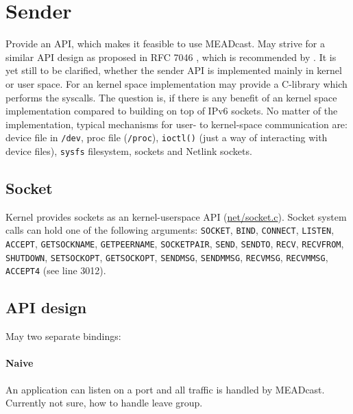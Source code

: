 \section{Sender}
Provide an API, which makes it feasible to use MEADcast.
May strive for a similar API design as proposed in RFC 7046
\cite{wahlisch2013common}, which is recommended by \cite{meadcast2}.
It is yet still to be clarified, whether the sender API is implemented mainly
in kernel or user space.
For an kernel space implementation may provide a C-library which performs the 
syscalls.
The question is, if there is any benefit of an kernel space implementation 
compared to building on top of IPv6 sockets.
No matter of the implementation, typical mechanisms for user- to kernel-space
communication are: device file in \texttt{/dev}, proc file (\texttt{/proc}),
\texttt{ioctl()} (just a way of interacting with device files), \texttt{sysfs} 
filesystem, sockets and Netlink sockets.

\subsection{Socket} %
\label{sub:Socket}
Kernel provides sockets as an kernel-userspace API (\href{https://git.kernel.org/pub/scm/linux/kernel/git/torvalds/linux.git/tree/net/socket.c}{net/socket.c}).
Socket system calls can hold one of the following arguments:
\texttt{SOCKET}, \texttt{BIND}, \texttt{CONNECT}, \texttt{LISTEN},
\texttt{ACCEPT}, \texttt{GETSOCKNAME}, \texttt{GETPEERNAME},
\texttt{SOCKETPAIR}, \texttt{SEND}, \texttt{SENDTO}, \texttt{RECV},
\texttt{RECVFROM}, \texttt{SHUTDOWN}, \texttt{SETSOCKOPT}, \texttt{GETSOCKOPT},
\texttt{SENDMSG}, \texttt{SENDMMSG}, \texttt{RECVMSG}, \texttt{RECVMMSG},
\texttt{ACCEPT4} (see line 3012).

\subsection{API design} %
\label{sub:API design}
May two separate bindings:

\paragraph{Naive} %
\label{par:Naive}
An application can listen on a port and all traffic is handled by MEADcast.
Currently not sure, how to handle leave group.

